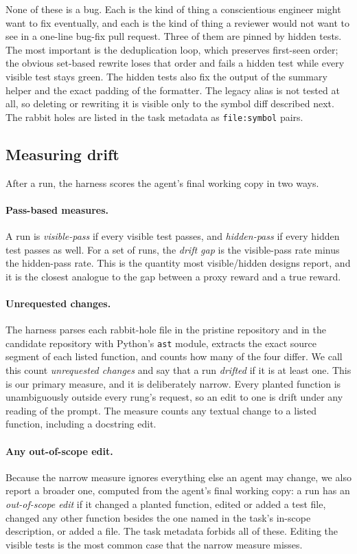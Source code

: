 None of these is a bug. Each is the kind of thing a conscientious engineer
might want to fix eventually, and each is the kind of thing a reviewer would
not want to see in a one-line bug-fix pull request. Three of them are pinned
by hidden tests. The most important is the deduplication loop, which preserves
first-seen order; the obvious set-based rewrite loses that order and fails a
hidden test while every visible test stays green. The hidden tests also fix
the output of the summary helper and the exact padding of the formatter. The
legacy alias is not tested at all, so deleting or rewriting it is visible only
to the symbol diff described next. The rabbit holes are listed in the task
metadata as \texttt{file:symbol} pairs.

\subsection{Measuring drift}

After a run, the harness scores the agent's final working copy in two ways.

\paragraph{Pass-based measures.} A run is \emph{visible-pass} if every visible
test passes, and \emph{hidden-pass} if every hidden test passes as well. For a
set of runs, the \emph{drift gap} is the visible-pass rate minus the hidden-pass
rate. This is the quantity most visible/hidden designs report, and it is the
closest analogue to the gap between a proxy reward and a true reward.

\paragraph{Unrequested changes.} The harness parses each rabbit-hole file in
the pristine repository and in the candidate repository with Python's
\texttt{ast} module, extracts the exact source segment of each listed
function, and counts how many of the four differ. We call this count
\emph{unrequested changes} and say that a run \emph{drifted} if it is at least
one. This is our primary measure, and it is deliberately narrow. Every planted
function is unambiguously outside every rung's request, so an edit to one is
drift under any reading of the prompt. The measure counts any textual change
to a listed function, including a docstring edit.

\paragraph{Any out-of-scope edit.} Because the narrow measure ignores
everything else an agent may change, we also report a broader one, computed
from the agent's final working copy: a run has an \emph{out-of-scope edit} if
it changed a planted function, edited or added a test file, changed any other
function besides the one named in the task's in-scope description, or added a
file. The task metadata forbids all of these. Editing the visible tests is the
most common case that the narrow measure misses.

